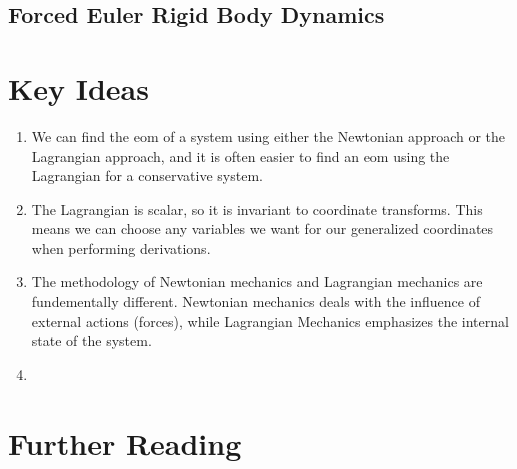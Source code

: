 \documentclass[12pt]{report}
\begin{document}
\subsection{Forced Euler Rigid Body Dynamics}
\section{Key Ideas}
\begin{enumerate}
    \item We can find the \gls{eom} of a system using either the Newtonian approach or the \gls{Lagrangian} approach, and it is often easier to find an \gls{eom} using the \gls{Lagrangian} for a conservative system.
    \item The \gls{Lagrangian} is scalar, so it is invariant to coordinate transforms. This means we can choose any variables we want for our generalized coordinates when performing derivations.
    \item The methodology of Newtonian mechanics and \gls{Lagrangian} mechanics are fundementally different. Newtonian mechanics deals with the influence of external actions (forces), while \gls{Lagrangian} Mechanics emphasizes the internal state of the system.
    \item %
\end{enumerate}
\section{Further Reading}
\end{document}

